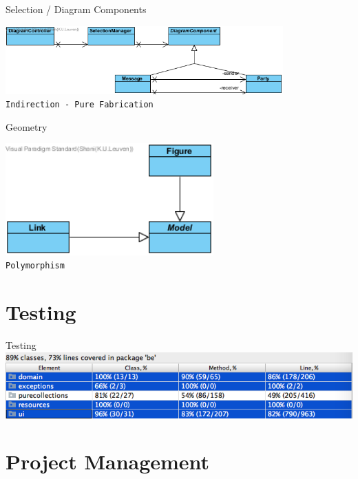 \documentclass[10pt]{beamer}
\begin{document}
\begin{frame}[fragile]{Selection / Diagram Components}
\begin{center}
\includegraphics[width=0.8\textwidth]{diagram4}
\vspace{0.5cm}\\\texttt{Indirection - Pure Fabrication}
\end{center}
\end{frame}

\begin{frame}[fragile]{Geometry}
	\begin{center}
	\includegraphics[width=0.6\textwidth]{diagram5}
	\vspace{0.5cm}\\\texttt{Polymorphism}
	\end{center}
\end{frame}

\section{Testing}

\begin{frame}[fragile]{Testing}
\includegraphics[width=1\textwidth]{coverage}
\end{frame}

\section{Project Management}
\end{document}
